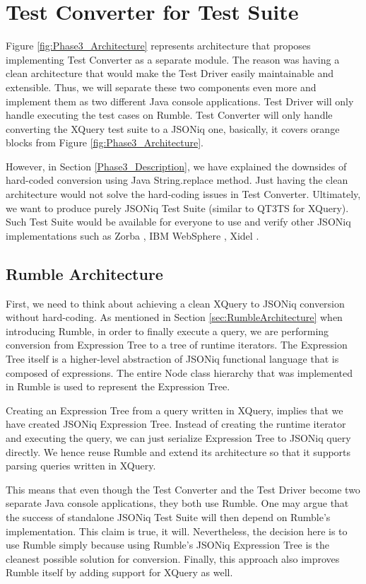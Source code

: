 
\chapter{Test Converter for Test Suite}
Figure \ref{fig:Phase3_Architecture} represents architecture that proposes implementing Test Converter as a separate module. The reason was having a clean architecture that would make the Test Driver easily maintainable and extensible. Thus, we will separate these two components even more and implement them as two different Java console applications. Test Driver will only handle executing the test cases on Rumble. Test Converter will only handle converting the XQuery test suite to a JSONiq one, basically, it covers orange blocks from Figure \ref{fig:Phase3_Architecture}. 

However, in Section \ref{Phase3_Description}, we have explained the downsides of hard-coded conversion using Java String.replace method. Just having the clean architecture would not solve the hard-coding issues in Test Converter. Ultimately, we want to produce purely JSONiq Test Suite (similar to QT3TS for XQuery). Such Test Suite would be available for everyone to use and verify other JSONiq implementations such as Zorba \cite{Zorba}, IBM WebSphere \cite{WebSphere}, Xidel \cite{Xidel}.

\section{Rumble Architecture}
First, we need to think about achieving a clean XQuery to JSONiq conversion without hard-coding. As mentioned in Section \ref{sec:RumbleArchitecture} when introducing Rumble, in order to finally execute a query, we are performing conversion from Expression Tree to a tree of runtime iterators. The Expression Tree itself is a higher-level abstraction of JSONiq functional language that is composed of expressions. The entire Node class hierarchy that was implemented in Rumble is used to represent the Expression Tree.

Creating an Expression Tree from a query written in XQuery, implies that we have created JSONiq Expression Tree. Instead of creating the runtime iterator and executing the query, we can just serialize Expression Tree to JSONiq query directly. We hence reuse Rumble and extend its architecture so that it supports parsing queries written in XQuery. 

This means that even though the Test Converter and the Test Driver become two separate Java console applications, they both use Rumble. One may argue that the success of standalone JSONiq Test Suite will then depend on Rumble's implementation. This claim is true, it will. Nevertheless, the decision here is to use Rumble simply because using Rumble's JSONiq Expression Tree is the cleanest possible solution for conversion. Finally, this approach also improves Rumble itself by adding support for XQuery as well.

